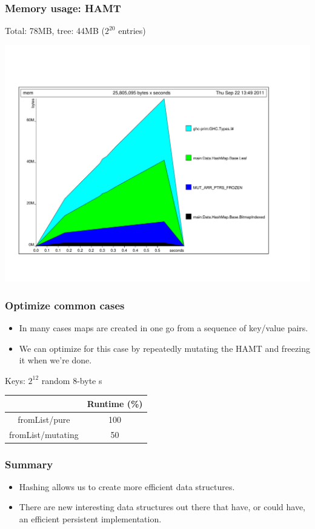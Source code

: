\documentclass[xetex,mathserif,serif]{beamer}
\newcommand{\code}[1]{\mbox{\texttt{\small{\color{CodeColor}{#1}}}}}
\begin{document}
\begin{frame}
  \frametitle{Memory usage: HAMT}

  Total: 78MB, tree: 44MB ($2^{20}$ \code{Int} entries)
  \begin{center}
  \includegraphics[angle=90,scale=0.3]{hamt-mem.pdf}
  \end{center}
\end{frame}

\begin{frame}
  \frametitle{Optimize common cases}
  \begin{itemize}
  \item In many cases maps are created in one go from a sequence of
    key/value pairs.
  \item We can optimize for this case by repeatedly mutating the HAMT
    and freezing it when we're done.
  \end{itemize}

  \bigskip
  Keys: $2^{12}$ random 8-byte \code{ByteString}s

  \bigskip
  \begin{center}
  \begin{tabular}{c|c}
                         & Runtime (\%) \\
    \hline fromList/pure & 100 \\
           fromList/mutating & 50 \\
  \end{tabular}
  \end{center}
\end{frame}

\begin{frame}
  \frametitle{Summary}
  \begin{itemize}
  \item Hashing allows us to create more efficient data structures.
  \item There are new interesting data structures out there that have,
    or could have, an efficient persistent implementation.
  \end{itemize}
\end{frame}
\end{document}
